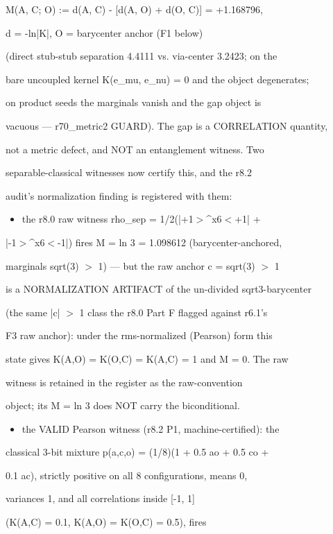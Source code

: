 \documentclass[11pt,a4paper]{article}
\theoremstyle{definition}
\begin{document}
    M(A, C; O) := d(A, C) - [d(A, O) + d(O, C)] = +1.168796,

    d = -ln|K|, O = barycenter anchor (F1 below)


(direct stub-stub separation 4.4111 vs. via-center 3.2423; on the

bare uncoupled kernel K(e\_mu, e\_nu) = 0 and the object degenerates;

on product seeds the marginals vanish and the gap object is

vacuous — r70\_metric2 GUARD). The gap is a CORRELATION quantity,

not a metric defect, and NOT an entanglement witness. Two

separable-classical witnesses now certify this, and the r8.2

audit's normalization finding is registered with them:

\begin{itemize}[leftmargin=1.4em]
\item the r8.0 raw witness rho\_sep = 1/2(|+1$>$\^{}{x6}$<$+1| +
\end{itemize}
    |-1$>$\^{}{x6}$<$-1|) fires M = ln 3 = 1.098612 (barycenter-anchored,

    marginals sqrt(3) $>$ 1) — but the raw anchor c = sqrt(3) $>$ 1

    is a NORMALIZATION ARTIFACT of the un-divided sqrt3-barycenter

    (the same |c| $>$ 1 class the r8.0 Part F flagged against r6.1's

    F3 raw anchor): under the rms-normalized (Pearson) form this

    state gives K(A,O) = K(O,C) = K(A,C) = 1 and M = 0. The raw

    witness is retained in the register as the raw-convention

    object; its M = ln 3 does NOT carry the biconditional.

\begin{itemize}[leftmargin=1.4em]
\item the VALID Pearson witness (r8.2 P1, machine-certified): the
\end{itemize}
    classical 3-bit mixture p(a,c,o) = (1/8)(1 + 0.5 ao + 0.5 co +

    0.1 ac), strictly positive on all 8 configurations, means 0,

    variances 1, and all correlations inside [-1, 1]

    (K(A,C) = 0.1, K(A,O) = K(O,C) = 0.5), fires
\end{document}
